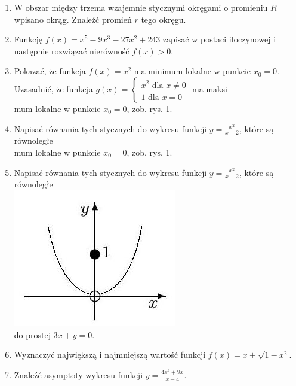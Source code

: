 \documentclass[10pt]{article}
\begin{document}
\begin{enumerate}
  \item W obszar między trzema wzajemnie stycznymi okręgami o promieniu \(R\) wpisano okrąg. Znaleźć promień \(r\) tego okręgu.
  \item Funkcję \(f(x)=x^{5}-9 x^{3}-27 x^{2}+243\) zapisać w postaci iloczynowej i następnie rozwiązać nierówność \(f(x)>0\).
  \item Pokazać, że funkcja \(f(x)=x^{2}\) ma minimum lokalne w punkcie \(x_{0}=0\). Uzasadnić, że funkcja \(g(x)=\left\{\begin{array}{r}x^{2} \text { dla } x \neq 0 \\ 1 \text { dla } x=0\end{array}\right.\) ma maksi-\\
mum lokalne w punkcie \(x_{0}=0\), zob. rys. 1.
  \item Napisać równania tych stycznych do wykresu funkcji \(y=\frac{x^{2}}{x-2}\), które są równoległe\\
mum lokalne w punkcie \(x_{0}=0\), zob. rys. 1.
  \item Napisać równania tych stycznych do wykresu funkcji \(y=\frac{x^{2}}{x-2}\), które są równoległe\\
\includegraphics[max width=\textwidth, center]{2024_11_21_80c827237e5b1a9f7989g-2(1)}\\
do prostej \(3 x+y=0\).
  \item Wyznaczyć największą i najmniejszą wartość funkcji \(f(x)=x+\sqrt{1-x^{2}}\).
  \item Znaleźć asymptoty wykresu funkcji \(y=\frac{4 x^{2}+9 x}{x-4}\).

\end{enumerate}
\end{document}
